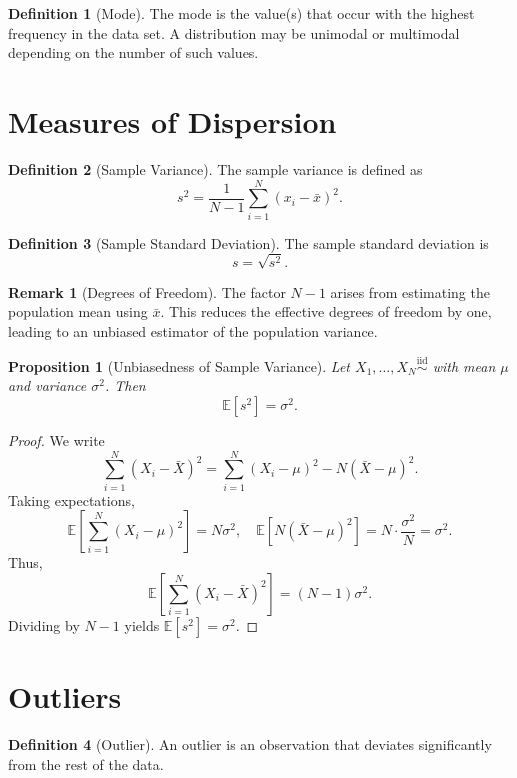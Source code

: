 \documentclass[12pt,oneside]{book}
\numberwithin{equation}{section}
\theoremstyle{definition}
\newtheorem{definition}{Definition}[section]
\newtheorem{remark}{Remark}[section]
\theoremstyle{plain}
\newtheorem{proposition}{Proposition}[section]
\theoremstyle{remark}
\newcommand{\E}{\mathbb{E}}
\newcommand{\iid}{\overset{\text{iid}}{\sim}}
\begin{document}
\begin{definition}[Mode]
The mode is the value(s) that occur with the highest frequency in the data set.
A distribution may be unimodal or multimodal depending on the number of such values.
\end{definition}

\section{Measures of Dispersion}

\begin{definition}[Sample Variance]
The sample variance is defined as
\[
s^2 = \frac{1}{N-1} \sum_{i=1}^N (x_i - \bar{x})^2.
\]
\end{definition}

\begin{definition}[Sample Standard Deviation]
The sample standard deviation is
\[
s = \sqrt{s^2}.
\]
\end{definition}

\begin{remark}[Degrees of Freedom]
The factor $N-1$ arises from estimating the population mean using $\bar{x}$.
This reduces the effective degrees of freedom by one, leading to an unbiased estimator of the population variance.
\end{remark}

\begin{proposition}[Unbiasedness of Sample Variance]
Let $X_1, \dots, X_N \iid$ with mean $\mu$ and variance $\sigma^2$. Then
\[
\E[s^2] = \sigma^2.
\]
\end{proposition}

\begin{proof}
We write
\[
\sum_{i=1}^N (X_i - \bar{X})^2
= \sum_{i=1}^N (X_i - \mu)^2 - N(\bar{X} - \mu)^2.
\]
Taking expectations,
\[
\E\left[\sum_{i=1}^N (X_i - \mu)^2\right] = N\sigma^2,
\quad
\E\left[N(\bar{X} - \mu)^2\right] = N \cdot \frac{\sigma^2}{N} = \sigma^2.
\]
Thus,
\[
\E\left[\sum_{i=1}^N (X_i - \bar{X})^2\right] = (N-1)\sigma^2.
\]
Dividing by $N-1$ yields $\E[s^2] = \sigma^2$.
\end{proof}

\section{Outliers}

\begin{definition}[Outlier]
An outlier is an observation that deviates significantly from the rest of the data.
\end{definition}
\end{document}
